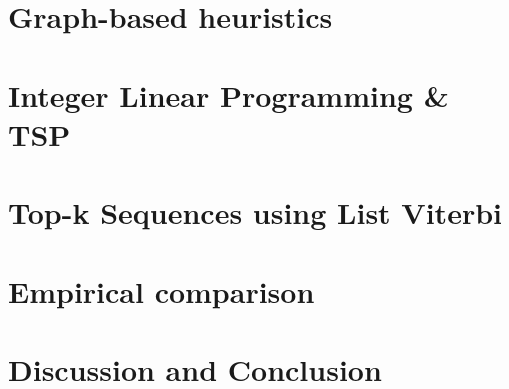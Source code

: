 \documentclass[sigconf]{acmart}
\begin{document}
\section{Graph-based heuristics}
\label{sec:heuristics}


\section{Integer Linear Programming \& TSP}
\label{sec:ilp}


\section{Top-k Sequences using List Viterbi}
\label{sec:viterbi}


\section{Empirical comparison}
\label{sec:experiments}


\section{Discussion and Conclusion}
\label{sec:discussion}




 
\end{document}
